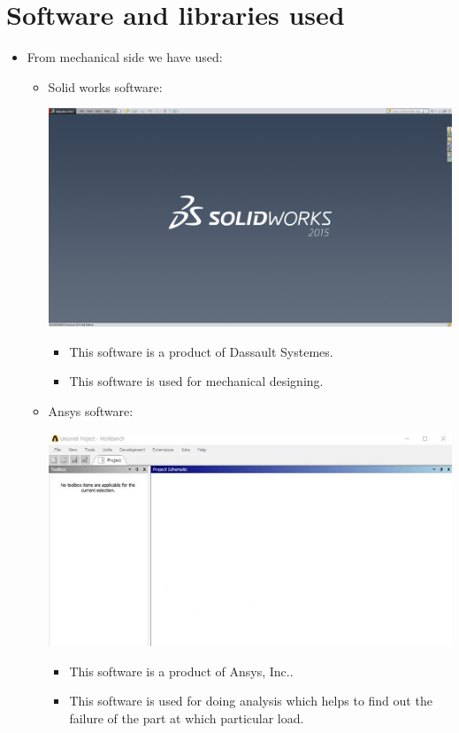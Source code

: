 \documentclass[a4paper,12pt,oneside]{book}
\begin{document}
\section{Software and libraries used}
\begin{itemize}
  \item From mechanical side we have used:
	\begin{itemize}
	\item Solid works software:
	\begin{center}
		\includegraphics[scale=.2]{solidworks_home_page.jpg}
	\end{center}
		\begin{itemize}
		\item This software is a product of Dassault Systemes.
		\item This software is used for mechanical designing.
		\end{itemize}
	\item Ansys software:
	\begin{center}
		\includegraphics[scale=.5]{asys_home_page.jpg}
	\end{center}
		\begin{itemize}
		\item This software is a product of Ansys, Inc..
		\item This software is used for doing analysis which helps to find out the failure of the part at which particular load.
		\end{itemize}
	\end{itemize}
\end{itemize}
\end{document}
